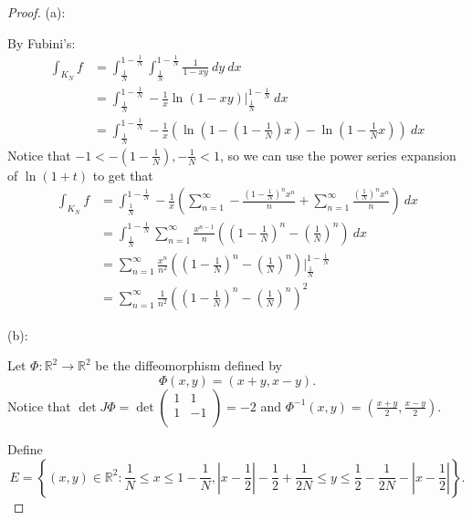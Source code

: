 \documentclass{article}
\theoremstyle{plain} %
\numberwithin{thm}{section} %
\theoremstyle{definition}
\begin{document}
        \begin{proof}
            (a):

    By Fubini's:
    \begin{align*}
        \int _{K_N} f &= \int _{\frac{1}{N}}^{1-\frac{1}{N}}\int _{\frac{1}{N}}^{1-\frac{1}{N}} \frac{1}{1-xy}\ dy\ dx \\
        &= \int _{\frac{1}{N}}^{1-\frac{1}{N}} -\frac{1}{x}\ln (1 - xy) \Big| _{\frac{1}{N}}^{1-\frac{1}{N}}\ dx \\
        &= \int _{\frac{1}{N}}^{1-\frac{1}{N}} -\frac{1}{x}\left( \ln \left( 1 - \left(1-\frac{1}{N}\right)x \right) - \ln \left( 1 - \frac{1}{N}x \right) \right)\ dx
    \end{align*}
    Notice that \(-1 < -\left( 1-\frac{1}{N} \right),-\frac{1}{N} < 1\), so we can use the power series expansion of \(\ln (1+t)\) to get that
    \begin{align*}
        \int _{K_N} f &= \int _{\frac{1}{N}}^{1-\frac{1}{N}} -\frac{1}{x}\left( \sum_{n=1}^{\infty} -\frac{\left( 1-\frac{1}{N}\right)^n x^n}{n} + \sum_{n=1}^{\infty} \frac{\left( \frac{1}{N} \right)^n x^n}{n}\right)\ dx \\
        &= \int _{\frac{1}{N}}^{1-\frac{1}{N}}\sum_{n=1}^{\infty} \frac{x^{n-1}}{n} \left( \left( 1 - \frac{1}{N} \right)^n - \left(\frac{1}{N} \right)^n\right)\ dx \\
        &= \sum_{n=1}^{\infty} \frac{x^n}{n^2}\left(  \left( 1 - \frac{1}{N} \right)^n - \left(\frac{1}{N} \right)^n \right) \Bigg| _{\frac{1}{N}}^{1-\frac{1}{N}} \\
        &= \sum_{n=1}^{\infty} \frac{1}{n^2} \left( \left( 1 - \frac{1}{N} \right)^n - \left(\frac{1}{N} \right)^n \right)^2
    \end{align*}
    \medskip

    (b):

    Let \(\Phi : \mathbb{R}^2 \to \mathbb{R}^2\) be the diffeomorphism defined by
    \[
        \Phi (x,y) = (x+y, x-y).
    \]
    Notice that \(\det J\Phi = \det \begin{pmatrix}
        1 &  1 \\
        1 &  -1 \\
    \end{pmatrix} = -2\) and \(\Phi ^{-1}(x,y) = \left( \frac{x+y}{2}, \frac{x-y}{2} \right)\).

    Define
    \[E = \left\{ (x,y) \in \mathbb{R}^2 : \frac{1}{N} \leq x \leq 1 - \frac{1}{N}, \left\vert x - \frac{1}{2} \right\vert - \frac{1}{2} + \frac{1}{2N} \leq y \leq \frac{1}{2} - \frac{1}{2N} - \left\vert x-\frac{1}{2} \right\vert\right\}.\]


\end{proof}
\end{document}
